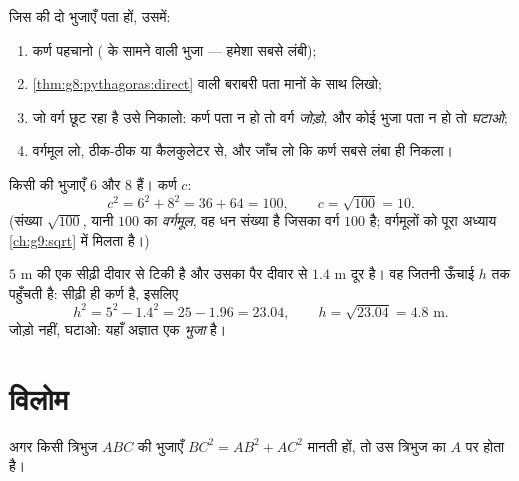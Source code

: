 \begin{method}[कोई लंबाई निकालना]\label{met:g8:pythagoras:compute}
जिस  की दो भुजाएँ पता हों, उसमें:
\begin{enumerate}
  \item कर्ण पहचानो ( के सामने वाली भुजा --- हमेशा सबसे लंबी);
  \item \cref{thm:g8:pythagoras:direct} वाली बराबरी पता मानों के
        साथ लिखो;
  \item जो वर्ग छूट रहा है उसे निकालो: कर्ण पता न हो तो वर्ग
        \emph{जोड़ो}, और कोई  भुजा पता न हो तो \emph{घटाओ};
  \item वर्गमूल लो, ठीक-ठीक या कैलकुलेटर से, और जाँच लो कि कर्ण
        सबसे लंबा ही निकला।
\end{enumerate}
\end{method}

\begin{example}[कर्ण निकालना]\label{ex:g8:pythagoras:hypotenuse}
किसी  की  भुजाएँ $6$ और $8$ हैं। कर्ण $c$:
\[
c^2 = 6^2 + 8^2 = 36 + 64 = 100,
\qquad
c = \sqrt{100} = 10 .
\]
(संख्या $\sqrt{100}$, यानी $100$ का \emph{वर्गमूल}, वह धन संख्या है
जिसका वर्ग $100$ है; वर्गमूलों को पूरा अध्याय \cref{ch:g9:sqrt} में
मिलता है।)
\end{example}

\begin{example}[कोई समकोण भुजा निकालना]\label{ex:g8:pythagoras:leg}
$5$ m की एक सीढ़ी दीवार से टिकी है और उसका पैर दीवार से $1.4$ m दूर
है। वह जितनी ऊँचाई $h$ तक पहुँचती है: सीढ़ी ही कर्ण है, इसलिए
\[
h^2 = 5^2 - 1.4^2 = 25 - 1.96 = 23.04,
\qquad
h = \sqrt{23.04} = 4.8 \text{ m}.
\]
जोड़ो नहीं, घटाओ: यहाँ अज्ञात एक \emph{ भुजा} है।
\end{example}

\section{विलोम}

\begin{theorem}[पाइथागोरस का विलोम]\label{thm:g8:pythagoras:converse}
अगर किसी त्रिभुज $ABC$ की भुजाएँ $BC^2 = AB^2 + AC^2$ मानती हों, तो
उस त्रिभुज का $A$ पर  होता है।
\end{theorem}
\admitted

